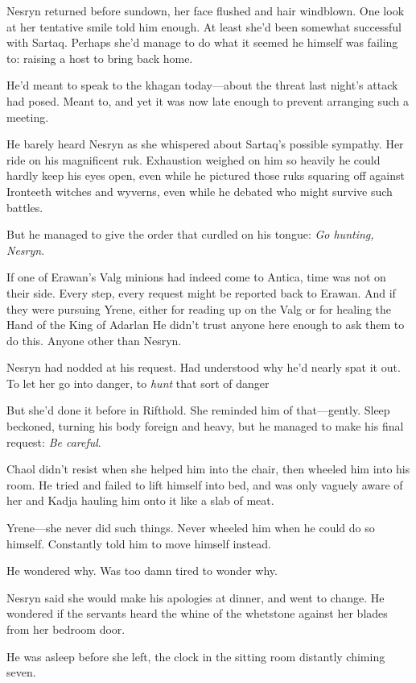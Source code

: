 Nesryn returned before sundown, her face flushed and hair windblown. One look at her tentative smile told him enough. At least she'd been somewhat successful with Sartaq. Perhaps she'd manage to do what it seemed he himself was failing to: raising a host to bring back home.

He'd meant to speak to the khagan today---about the threat last night's attack had posed. Meant to, and yet it was now late enough to prevent arranging such a meeting.

He barely heard Nesryn as she whispered about Sartaq's possible sympathy. Her ride on his magnificent ruk. Exhaustion weighed on him so heavily he could hardly keep his eyes open, even while he pictured those ruks squaring off against Ironteeth witches and wyverns, even while he debated who might survive such battles.

But he managed to give the order that curdled on his tongue: \emph{Go hunting, Nesryn}.

If one of Erawan's Valg minions had indeed come to Antica, time was not on their side. Every step, every request might be reported back to Erawan. And if they were pursuing Yrene, either for reading up on the Valg or for healing the Hand of the King of Adarlan  He didn't trust anyone here enough to ask them to do this. Anyone other than Nesryn.

Nesryn had nodded at his request. Had understood why he'd nearly spat it out. To let her go into danger, to \emph{hunt} that sort of danger


But she'd done it before in Rifthold. She reminded him of that---gently. Sleep beckoned, turning his body foreign and heavy, but he managed to make his final request: \emph{Be careful}.

Chaol didn't resist when she helped him into the chair, then wheeled him into his room. He tried and failed to lift himself into bed, and was only vaguely aware of her and Kadja hauling him onto it like a slab of meat.

Yrene---she never did such things. Never wheeled him when he could do so himself. Constantly told him to move himself instead.

He wondered why. Was too damn tired to wonder why.

Nesryn said she would make his apologies at dinner, and went to change. He wondered if the servants heard the whine of the whetstone against her blades from her bedroom door.

He was asleep before she left, the clock in the sitting room distantly chiming seven.

